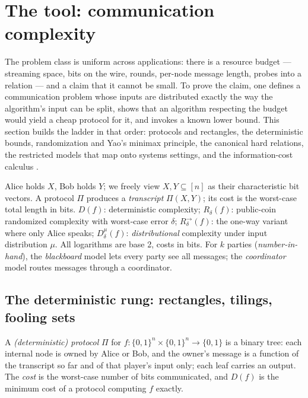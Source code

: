 \section{The tool: communication complexity}
\label{sec:cc-tool}

The problem class is uniform across applications: there is a resource budget ---
streaming space, bits on the wire, rounds, per-node message length, probes into a
relation --- and a claim that it cannot be small. To prove the claim, one defines a
communication problem whose inputs are distributed exactly the way the algorithm's input
can be split, shows that an algorithm respecting the budget would yield a cheap protocol
for it, and invokes a known lower bound. This section builds the ladder in that order:
protocols and rectangles, the deterministic bounds, randomization and Yao's minimax
principle, the canonical hard relations, the restricted models that map onto systems
settings, and the information-cost calculus
\citep{communication-complexity-bg1,communication-complexity-bg2}.

\begin{remarkbox}[Notation]
Alice holds $X$, Bob holds $Y$; we freely view $X, Y \subseteq [n]$ as their
characteristic bit vectors. A protocol $\Pi$ produces a \emph{transcript} $\Pi(X,Y)$;
its cost is the worst-case total length in bits. $D(f)$: deterministic complexity;
$R_\delta(f)$: public-coin randomized complexity with worst-case error $\delta$;
$R^{\rightarrow}_\delta(f)$: the one-way variant where only Alice speaks;
$D^\mu_\delta(f)$: \emph{distributional} complexity under input distribution $\mu$.
All logarithms are base 2, costs in bits. For $k$ parties (\emph{number-in-hand}), the
\emph{blackboard} model lets every party see all messages; the \emph{coordinator} model
routes messages through a coordinator.
\end{remarkbox}

\subsection{The deterministic rung: rectangles, tilings, fooling sets}
\label{sec:cc-det}

\begin{definition}\label{def:cc-model}
A \emph{(deterministic) protocol} $\Pi$ for $f\colon \{0,1\}^n \times \{0,1\}^n \to
\{0,1\}$ is a binary tree: each internal node is owned by Alice or Bob, and the owner's
message is a function of the transcript so far and of that player's input only; each
leaf carries an output. The \emph{cost} is the worst-case number of bits communicated,
and $D(f)$ is the minimum cost of a protocol computing $f$ exactly.
\end{definition}

